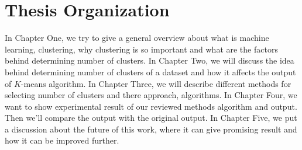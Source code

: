 \section{Thesis Organization}
In Chapter One, we try to give a general overview about what is machine learning, clustering,
why clustering is so important and what are the factors behind determining number of clusters.
In Chapter Two, we will discuss the idea behind determining number of clusters of a dataset and
how it affects the output of $K$-means algorithm.
In Chapter Three, we will describe different methods for selecting number of clusters and there approach,
algorithms.
In Chapter Four, we want to show experimental result of our reviewed methods algorithm and output.
Then we'll compare the output with the original output.
In Chapter Five, we put a discussion about the future of this work, where it can give promising
result and how it can be improved further.

\endinput
